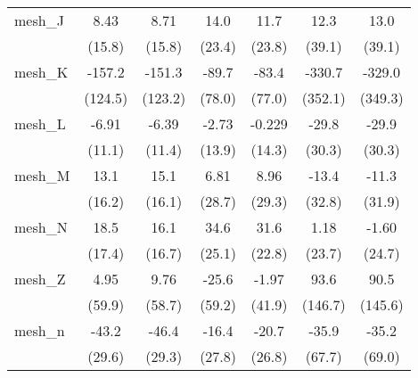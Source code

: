 \begin{tabular}{lcccccc}
   mesh\_J                                                     & 8.43          & 8.71          & 14.0           & 11.7          & 12.3          & 13.0\\   
                                                               & (15.8)        & (15.8)        & (23.4)         & (23.8)        & (39.1)        & (39.1)\\   
   mesh\_K                                                     & -157.2        & -151.3        & -89.7          & -83.4         & -330.7        & -329.0\\   
                                                               & (124.5)       & (123.2)       & (78.0)         & (77.0)        & (352.1)       & (349.3)\\   
   mesh\_L                                                     & -6.91         & -6.39         & -2.73          & -0.229        & -29.8         & -29.9\\   
                                                               & (11.1)        & (11.4)        & (13.9)         & (14.3)        & (30.3)        & (30.3)\\   
   mesh\_M                                                     & 13.1          & 15.1          & 6.81           & 8.96          & -13.4         & -11.3\\   
                                                               & (16.2)        & (16.1)        & (28.7)         & (29.3)        & (32.8)        & (31.9)\\   
   mesh\_N                                                     & 18.5          & 16.1          & 34.6           & 31.6          & 1.18          & -1.60\\   
                                                               & (17.4)        & (16.7)        & (25.1)         & (22.8)        & (23.7)        & (24.7)\\   
   mesh\_Z                                                     & 4.95          & 9.76          & -25.6          & -1.97         & 93.6          & 90.5\\   
                                                               & (59.9)        & (58.7)        & (59.2)         & (41.9)        & (146.7)       & (145.6)\\   
   mesh\_n                                                     & -43.2         & -46.4         & -16.4          & -20.7         & -35.9         & -35.2\\   
                                                               & (29.6)        & (29.3)        & (27.8)         & (26.8)        & (67.7)        & (69.0)\\   

\end{tabular}
